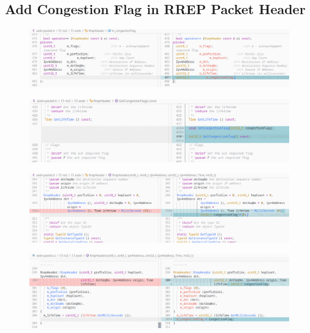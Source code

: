 \documentclass[12pt, a4paper]{article}
\begin{document}
\subsection{Add Congestion Flag in RREP Packet Header}
\begin{figure}[H]
\centering
\includegraphics[scale = 0.4]{images/cc-aodv/rrep-01.png}

\end{figure}
\begin{figure}[H]
\centering
\includegraphics[scale = 0.4]{images/cc-aodv/rrep-02.png}

\end{figure}
\begin{figure}[H]
\centering
\includegraphics[scale = 0.4]{images/cc-aodv/rrep-03.png}

\end{figure}
\begin{figure}[H]
\centering
\includegraphics[scale = 0.4]{images/cc-aodv/rrep-04.png}

\end{figure}
\end{document}
